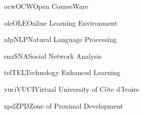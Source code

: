 

\newacronym
{ocw}{OCW}{Open CourseWare}

\newacronym
{ole}{OLE}{Online Learning Environment}

\newacronym
{nlp}{NLP}{Natural Language Processing}

\newacronym
{sna}{SNA}{Social Network Analysis}

\newacronym
{tel}{TEL}{Technology Enhanced Learning}

\newacronym
{vuci}{VUCI}{Virtual University of Côte d'Ivoire}

\newacronym
{zpd}{ZPD}{Zone of Proximal Development}

